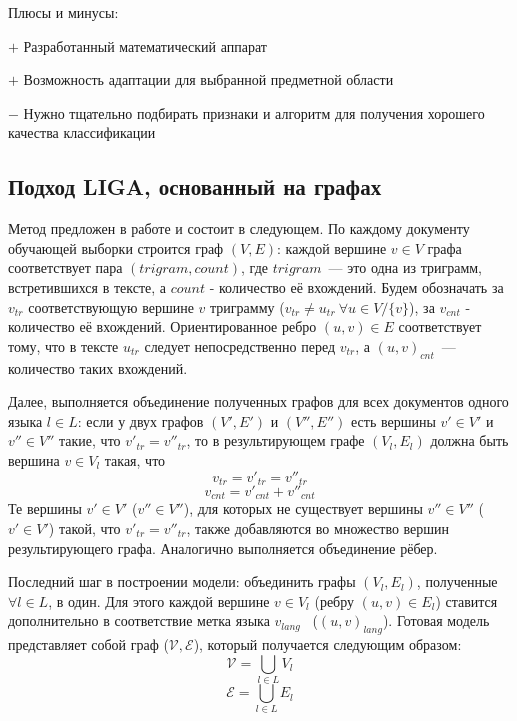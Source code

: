 \documentclass[a4paper, 14pt]{article}
\begin{document}
		\noindent Плюсы и минусы:
		
		$+$ Разработанный математический аппарат
		
		$+$ Возможность адаптации для выбранной предметной области
		
		$-$ Нужно тщательно подбирать признаки и алгоритм для получения хорошего качества классификации
		
		\subsection{Подход LIGA, основанный на графах}
		Метод предложен в работе \cite{liga} и состоит в следующем.				
		По каждому документу обучающей выборки строится граф $(V, E)$:
		 каждой вершине $v \in V$ графа соответствует пара $(trigram, count)$, где $trigram$~--- это одна
		из триграмм, встретившихся в тексте, а $count$ - количество её вхождений. Будем обозначать за $v_{tr}$ соответствующую вершине $v$ триграмму
		($v_{tr} \neq u_{tr} \ \forall u \in V/ \{v\}$), за $v_{cnt}$ - количество её вхождений. 
		Ориентированное ребро $(u, v) \in E$ соответствует тому, что в тексте $u_{tr}$ следует непосредственно
		перед $v_{tr}$, а $(u, v)_{cnt}$~--- количество таких вхождений.
		
		Далее, выполняется объединение полученных графов для всех документов одного языка $l \in L$: если у двух графов $(V', E')$ и $(V'', E'')$ есть вершины
		$v' \in V'$ и $v'' \in V''$ такие, что $v'_{tr} = v''_{tr}$, то в результирующем графе $(V_{l}, E_{l})$ должна быть вершина 
		$v \in V_{l}$ такая, что 
		$$v_{tr} = v'_{tr} = v''_{tr}$$ $$v_{cnt} = v'_{cnt} + v''_{cnt}$$
		Те вершины $v' \in V'$ ($v'' \in V''$), для которых  не существует вершины $v'' \in V''$ ($v' \in V'$) такой, что $v'_{tr} = v''_{tr}$, также добавляются во множество вершин результирующего графа.
		Аналогично выполняется объединение рёбер.
		
		Последний шаг в построении модели: объединить графы $(V_{l}, E_{l})$, полученные $\forall l \in L$, в один. 
		Для этого каждой вершине $v \in V_{l}$
		(ребру $(u, v) \in E_{l}$) ставится дополнительно в соответствие метка языка $v_{lang}$ \ ($(u, v)_{lang}$). 
		Готовая модель представляет собой граф
		($\mathcal{V}, \mathcal{E}$), который получается следующим образом:
		$$ \mathcal{V} = \bigcup_{l \in L} V_{l}$$
		$$ \mathcal{E} = \bigcup_{l \in L} E_{l}$$
		
\end{document}
